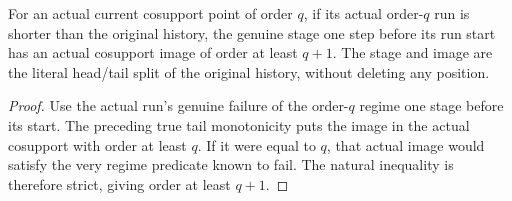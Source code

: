 \begin{theorem}
\label{hir:original-finite-order-cut-before-run-start}
\leanok
For an actual current cosupport point of order $q$, if its actual order-$q$
run is shorter than the original history, the genuine stage one step
before its run start has an actual cosupport image of order at least
$q+1$. The stage and image are the literal head/tail split of the original
history, without deleting any position.
\end{theorem}
\begin{proof}
Use the actual run's genuine failure of the order-$q$ regime one stage
before its start. The preceding true tail monotonicity puts the image
in the actual cosupport with order at least $q$. If it were equal to $q$,
that actual image would satisfy the very regime predicate known to fail.
The natural inequality is therefore strict, giving order at least $q+1$.
\end{proof}

